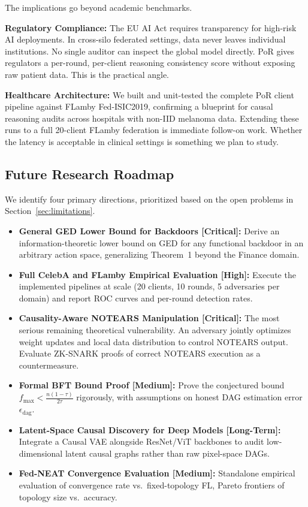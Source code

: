 \documentclass[journal]{IEEEtran}
\begin{document}
The implications go beyond academic benchmarks.

\textbf{Regulatory Compliance:} The EU AI Act requires transparency for high-risk AI deployments. In cross-silo federated settings, data never leaves individual institutions. No single auditor can inspect the global model directly. PoR gives regulators a per-round, per-client reasoning consistency score without exposing raw patient data. This is the practical angle.

\textbf{Healthcare Architecture:} We built and unit-tested the complete PoR client pipeline against FLamby Fed-ISIC2019, confirming a blueprint for causal reasoning audits across hospitals with non-IID melanoma data. Extending these runs to a full 20-client FLamby federation is immediate follow-on work. Whether the latency is acceptable in clinical settings is something we plan to study.

\subsection{Future Research Roadmap}

We identify four primary directions, prioritized based on the open problems in Section~\ref{sec:limitations}.

\begin{itemize}
\item \textbf{General GED Lower Bound for Backdoors [Critical]:} Derive an information-theoretic lower bound on GED for any functional backdoor in an arbitrary action space, generalizing Theorem~1 beyond the Finance domain.

\item \textbf{Full CelebA and FLamby Empirical Evaluation [High]:} Execute the implemented pipelines at scale (20 clients, 10 rounds, 5 adversaries per domain) and report ROC curves and per-round detection rates.

\item \textbf{Causality-Aware NOTEARS Manipulation [Critical]:} The most serious remaining theoretical vulnerability. An adversary jointly optimizes weight updates and local data distribution to control NOTEARS output. Evaluate ZK-SNARK proofs of correct NOTEARS execution as a countermeasure.

\item \textbf{Formal BFT Bound Proof [Medium]:} Prove the conjectured bound $f_{\max} < \frac{n(1-\tau)}{2\tau}$ rigorously, with assumptions on honest DAG estimation error $\epsilon_{\text{dag}}$.

\item \textbf{Latent-Space Causal Discovery for Deep Models [Long-Term]:} Integrate a Causal VAE alongside ResNet/ViT backbones to audit low-dimensional latent causal graphs rather than raw pixel-space DAGs.

\item \textbf{Fed-NEAT Convergence Evaluation [Medium]:} Standalone empirical evaluation of convergence rate vs.\ fixed-topology FL, Pareto frontiers of topology size vs.\ accuracy.
\end{itemize}
\end{document}
